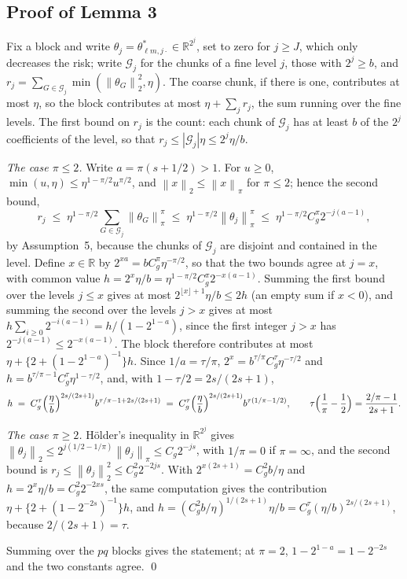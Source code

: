 \documentclass[10pt]{book}
\theoremstyle{definition}
\newcommand{\R}{\mathbb{R}}
\newcommand{\norm}[1]{\left\lVert #1 \right\rVert}
\newcommand{\cv}{\ell}
\newcommand{\md}{m}
\newcommand{\lev}{j}
\newcommand{\Gcal}{\mathcal{G}}
\begin{document}
{\color{colR1}
\subsection*{Proof of Lemma 3}

Fix a block and write $\theta_{\lev} = \theta^{*}_{\cv\md,\lev\cdot} \in
\R^{2^{\lev}}$, set to zero for $\lev \ge J$, which only decreases the risk;
write $\Gcal_{\lev}$ for the chunks of a fine level $\lev$, those with
$2^{\lev} \ge b$, and $r_{\lev} = \sum_{G\in\Gcal_{\lev}}
\min(\norm{\theta_{G}}_{2}^{2},\eta)$. The coarse chunk, if there is one,
contributes at most $\eta$, so the block contributes at most
$\eta + \sum_{\lev}r_{\lev}$, the sum running over the fine levels. The first
bound on $r_{\lev}$ is the count: each chunk of $\Gcal_{\lev}$ has at least $b$
of the $2^{\lev}$ coefficients of the level, so that
$r_{\lev} \le |\Gcal_{\lev}|\eta \le 2^{\lev}\eta/b$.

\emph{The case $\pi \le 2$.} Write $a = \pi(s+1/2) > 1$. For $u \ge 0$,
$\min(u,\eta) \le \eta^{1-\pi/2}u^{\pi/2}$, and $\norm{x}_{2} \le \norm{x}_{\pi}$
for $\pi \le 2$; hence the second bound,
\[
  r_{\lev} \;\le\; \eta^{1-\pi/2}\sum_{G\in\Gcal_{\lev}}\norm{\theta_{G}}_{\pi}^{\pi}
  \;\le\; \eta^{1-\pi/2}\norm{\theta_{\lev}}_{\pi}^{\pi}
  \;\le\; \eta^{1-\pi/2}C_g^{\pi}2^{-\lev(a-1)},
\]
by Assumption~5, because the chunks of $\Gcal_{\lev}$ are disjoint and
contained in the level. Define $x \in \R$ by
$2^{xa} = bC_g^{\pi}\eta^{-\pi/2}$, so that the two bounds agree at
$\lev = x$, with common value
$h = 2^{x}\eta/b = \eta^{1-\pi/2}C_g^{\pi}2^{-x(a-1)}$. Summing the first bound
over the levels $\lev \le x$ gives at most $2^{\lfloor x\rfloor+1}\eta/b \le 2h$
(an empty sum if $x < 0$), and summing the second over the levels $\lev > x$
gives at most $h\sum_{i\ge0}2^{-i(a-1)} = h/(1-2^{1-a})$, since the first
integer $\lev > x$ has $2^{-\lev(a-1)} \le 2^{-x(a-1)}$. The block therefore
contributes at most $\eta + \{2 + (1-2^{1-a})^{-1}\}h$. Since $1/a = \tau/\pi$,
$2^{x} = b^{\tau/\pi}C_g^{\tau}\eta^{-\tau/2}$ and
$h = b^{\tau/\pi-1}C_g^{\tau}\eta^{1-\tau/2}$, and, with
$1-\tau/2 = 2s/(2s+1)$,
\[
  h \;=\; C_g^{\tau}\Bigl(\frac{\eta}{b}\Bigr)^{2s/(2s+1)}
  b^{\tau/\pi - 1 + 2s/(2s+1)}
  \;=\; C_g^{\tau}\Bigl(\frac{\eta}{b}\Bigr)^{2s/(2s+1)}
  b^{\tau(1/\pi-1/2)},
  \qquad
  \tau\Bigl(\frac{1}{\pi}-\frac12\Bigr) = \frac{2/\pi-1}{2s+1}.
\]

\emph{The case $\pi \ge 2$.} Hölder's inequality in $\R^{2^{\lev}}$ gives
$\norm{\theta_{\lev}}_{2} \le 2^{\lev(1/2-1/\pi)}\norm{\theta_{\lev}}_{\pi} \le
C_g2^{-\lev s}$, with $1/\pi = 0$ if $\pi = \infty$, and the second bound is
$r_{\lev} \le \norm{\theta_{\lev}}_{2}^{2} \le C_g^{2}2^{-2\lev s}$. With
$2^{x(2s+1)} = C_g^{2}b/\eta$ and $h = 2^{x}\eta/b = C_g^{2}2^{-2xs}$, the same
computation gives the contribution $\eta + \{2 + (1-2^{-2s})^{-1}\}h$, and
$h = (C_g^{2}b/\eta)^{1/(2s+1)}\eta/b = C_g^{\tau}(\eta/b)^{2s/(2s+1)}$, because
$2/(2s+1) = \tau$.

Summing over the $pq$ blocks gives the statement; at $\pi = 2$,
$1-2^{1-a} = 1-2^{-2s}$ and the two constants agree. \qed
}
\end{document}
